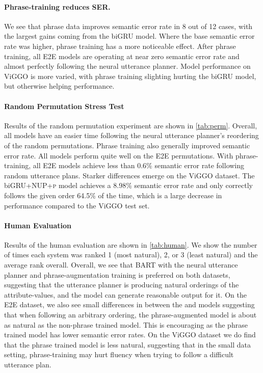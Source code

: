 

\paragraph{Phrase-training reduces SER.} We see that phrase data improves semantic error rate
in 8 out of 12 cases, with the largest gains coming from the biGRU
 model.  Where the base semantic error rate was higher, phrase training has a more
noticeable effect. After phrase training, all E2E models are operating at near
zero semantic error rate and almost perfectly following the neural utterance planner. Model performance on ViGGO
is more varied, with phrase training slighting hurting the biGRU
 model, but otherwise helping performance.

\paragraph{Random Permutation Stress Test} Results of the random permutation
experiment are shown in \autoref{tab:perm}.  Overall, all models have an
easier time following the neural utterance planner's reordering of
the random
permutations. Phrase training also generally improved semantic error rate.  All models perform
quite well on the E2E permutations.  
With phrase-training,
all E2E models achieve less than 0.6\% semantic error rate following random 
utterance plans.
Starker differences emerge on the ViGGO dataset.  The biGRU\textsc{+NUP+p} model
achieves a 8.98\% semantic error rate and only correctly follows the given 
order 64.5\% of
the time, which is a large decrease in performance compared to the ViGGO test set.%



\paragraph{Human Evaluation} Results of the human evaluation are shown in
\autoref{tab:human}. We show the number of times each system was ranked 1
(most natural), 2, or 3 (least natural) and the average rank overall.
Overall, we see that BART  with the neural utterance planner 
and phrase-augmentation training is
preferred on both datasets, suggesting that the utterance planner is
producing natural orderings of the attribute-values, and the model can
generate reasonable output for it. On the E2E dataset, we also see small
differences in between the  and  models
suggesting that when following an arbitrary ordering, the phrase-augmented
model is about as natural as the non-phrase trained model. This is encouraging
as the phrase trained model has lower semantic error rates. 
On the ViGGO dataset we do find
that the phrase trained model is less natural, suggesting that in the small
data setting, phrase-training may hurt fluency when trying to follow a
difficult utterance plan.


